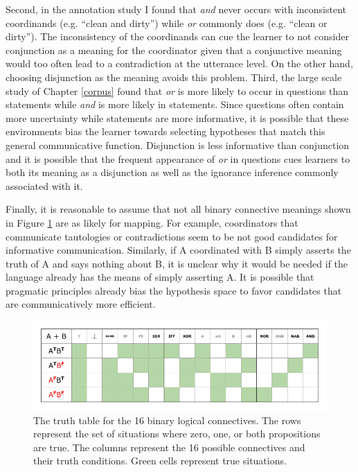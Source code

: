 \documentclass[floatsintext,man]{apa6}
\theoremstyle{definition}
\theoremstyle{definition}
\theoremstyle{definition}
\theoremstyle{remark}
\begin{document}
Second, in the annotation study I found that \emph{and} never occurs
with inconsistent coordinands (e.g. \enquote{clean and dirty}) while
\emph{or} commonly does (e.g. \enquote{clean or dirty}). The
inconsistency of the coordinands can cue the learner to not consider
conjunction as a meaning for the coordinator given that a conjunctive
meaning would too often lead to a contradiction at the utterance level.
On the other hand, choosing disjunction as the meaning avoids this
problem. Third, the large scale study of Chapter \ref{corpus} found that
\emph{or} is more likely to occur in questions than statements while
\emph{and} is more likely in statements. Since questions often contain
more uncertainty while statements are more informative, it is possible
that these environments bias the learner towards selecting hypotheses
that match this general communicative function. Disjunction is less
informative than conjunction and it is possible that the frequent
appearance of \emph{or} in questions cues learners to both its meaning
as a disjunction as well as the ignorance inference commonly associated
with it.

Finally, it is reasonable to assume that not all binary connective
meanings shown in Figure \ref{fig:binaryLogicalConnectivess} are as
likely for mapping. For example, coordinators that communicate
tautologies or contradictions seem to be not good candidates for
informative communication. Similarly, if A coordinated with B simply
asserts the truth of A and says nothing about B, it is unclear why it
would be needed if the language already has the means of simply
asserting A. It is possible that pragmatic principles already bias the
hypothesis space to favor candidates that are communicatively more
efficient.

\begin{figure}[tb]

{\centering \includegraphics{figs/binaryLogicalConnectivess-1} 

}

\caption{The truth table for the 16 binary logical connectives. The rows represent the set of situations where zero, one, or both propositions are true. The columns represent the 16 possible connectives and their truth conditions. Green cells represent true situations.}\label{fig:binaryLogicalConnectivess}
\end{figure}
\end{document}
